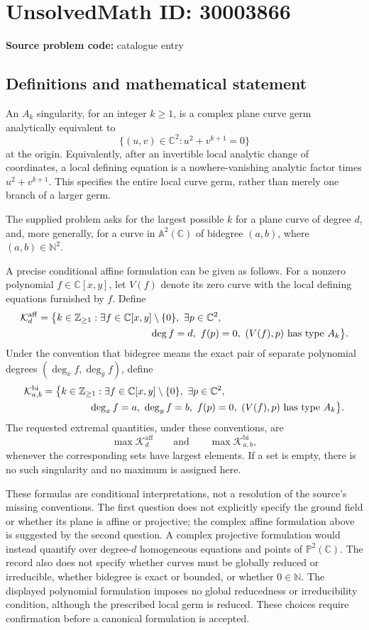 \documentclass[11pt]{article}
\newcommand{\N}{\mathbb{N}}
\newcommand{\Z}{\mathbb{Z}}
\newcommand{\C}{\mathbb{C}}
\newcommand{\A}{\mathbb{A}}
\newcommand{\PP}{\mathbb{P}}
\begin{document}
\section*{UnsolvedMath ID: 30003866}
\textbf{Source problem code:} catalogue entry
\subsection{Definitions and mathematical statement}
An \(A_k\) singularity, for an integer \(k\geq 1\), is a complex plane curve germ analytically equivalent to
\[
\{(u,v)\in\C^2:u^2+v^{k+1}=0\}
\]
at the origin. Equivalently, after an invertible local analytic change of coordinates, a local defining equation is a nowhere-vanishing analytic factor times \(u^2+v^{k+1}\). This specifies the entire local curve germ, rather than merely one branch of a larger germ.

The supplied problem asks for the largest possible \(k\) for a plane curve of degree \(d\), and, more generally, for a curve in \(\A^2(\C)\) of bidegree \((a,b)\), where \((a,b)\in\N^2\).

A precise conditional affine formulation can be given as follows. For a nonzero polynomial \(f\in\C[x,y]\), let \(V(f)\) denote its zero curve with the local defining equations furnished by \(f\). Define
\[
\begin{aligned}
\mathcal K_d^{\mathrm{aff}}
={}&\bigl\{k\in\Z_{\geq1}:\exists f\in\C[x,y]\setminus\{0\},\ \exists p\in\C^2,\\
&\hspace{35mm}\deg f=d,\ f(p)=0,\ (V(f),p)\text{ has type }A_k\bigr\}.
\end{aligned}
\]
Under the convention that bidegree means the exact pair of separate polynomial degrees \((\deg_x f,\deg_y f)\), define
\[
\begin{aligned}
\mathcal K_{a,b}^{\mathrm{bi}}
={}&\bigl\{k\in\Z_{\geq1}:\exists f\in\C[x,y]\setminus\{0\},\ \exists p\in\C^2,\\
&\hspace{12mm}\deg_x f=a,\ \deg_y f=b,\ f(p)=0,\ (V(f),p)\text{ has type }A_k\bigr\}.
\end{aligned}
\]
The requested extremal quantities, under these conventions, are
\[
\max\mathcal K_d^{\mathrm{aff}}
\qquad\text{and}\qquad
\max\mathcal K_{a,b}^{\mathrm{bi}},
\]
whenever the corresponding sets have largest elements. If a set is empty, there is no such singularity and no maximum is assigned here.

These formulas are conditional interpretations, not a resolution of the source's missing conventions. The first question does not explicitly specify the ground field or whether its plane is affine or projective; the complex affine formulation above is suggested by the second question. A complex projective formulation would instead quantify over degree-\(d\) homogeneous equations and points of \(\PP^2(\C)\). The record also does not specify whether curves must be globally reduced or irreducible, whether bidegree is exact or bounded, or whether \(0\in\N\). The displayed polynomial formulation imposes no global reducedness or irreducibility condition, although the prescribed local germ is reduced. These choices require confirmation before a canonical formulation is accepted.
\end{document}
